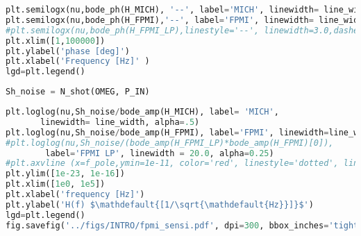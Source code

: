 \begin{lstlisting}[frame=single, language=Python]
plt.semilogx(nu,bode_ph(H_MICH), '--', label='MICH', linewidth= line_width, alpha=.5)
plt.semilogx(nu,bode_ph(H_FPMI),'--', label='FPMI', linewidth= line_width)
#plt.semilogx(nu,bode_ph(H_FPMI_LP),linestyle='--', linewidth=3.0,dashes=(3,10))
plt.xlim([1,100000])
plt.ylabel('phase [deg]')
plt.xlabel('Frequency [Hz]' )
lgd=plt.legend()
\end{lstlisting}

\begin{lstlisting}[frame=single, language=Python]
Sh_noise = N_shot(OMEG, P_IN)
\end{lstlisting}

\begin{lstlisting}[frame=single, language=Python]
plt.loglog(nu,Sh_noise/bode_amp(H_MICH), label= 'MICH', 
	   linewidth= line_width, alpha=.5)
plt.loglog(nu,Sh_noise/bode_amp(H_FPMI), label='FPMI', linewidth=line_width)
#plt.loglog(nu,Sh_noise/(bode_amp(H_FPMI_LP)*bode_amp(H_FPMI)[0]), 
	    label='FPMI LP', linewidth = 20.0, alpha=0.25)
#plt.axvline (x=f_pole,ymin=1e-11, color='red', linestyle='dotted', linewidth=3)
plt.ylim([1e-23, 1e-16])
plt.xlim([1e0, 1e5])
plt.xlabel('frequency [Hz]')
plt.ylabel('H(f) $\mathdefault{[1/\sqrt{\mathdefault{Hz}}]}$')
lgd=plt.legend()
fig.savefig('../figs/INTRO/fpmi_sensi.pdf', dpi=300, bbox_inches='tight')
\end{lstlisting}

